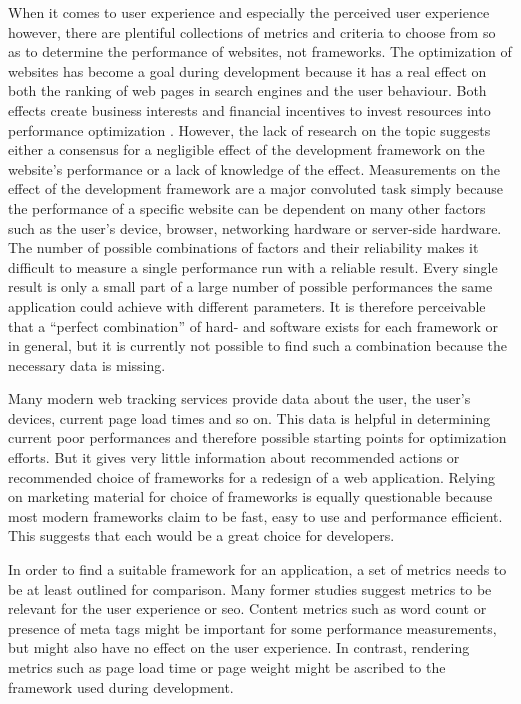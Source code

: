 \documentclass[a4paper, 12pt]{article}
\begin{document}
When it comes to user experience and especially the perceived user experience however, there are plentiful collections of metrics and criteria to choose from so as to determine the performance of websites, not frameworks.
The optimization of websites has become a goal during development because it has a real effect on both the ranking of web pages in search engines and the user behaviour.
Both effects create business interests and financial incentives to invest resources into performance optimization \citep{webprophet,effectsofwebpagecontents}.
However, the lack of research on the topic suggests either a consensus for a negligible effect of the development framework on the website's performance or a lack of knowledge of the effect.
Measurements on the effect of the development framework are a major convoluted task simply because the performance of a specific website can be dependent on many other factors such as the user's device, browser, networking hardware or server-side hardware.
The number of possible combinations of factors and their reliability makes it difficult to measure a single performance run with a reliable result.
Every single result is only a small part of a large number of possible performances the same application could achieve with different parameters.
It is therefore perceivable that a \enquote{perfect combination} of hard- and software exists for each framework or in general, but it is currently not possible to find such a combination because the necessary data is missing.

Many modern web tracking services provide data about the user, the user's devices, current page load times and so on.
This data is helpful in determining current poor performances and therefore possible starting points for optimization efforts.
But it gives very little information about recommended actions or recommended choice of frameworks for a redesign of a web application.
Relying on marketing material for choice of frameworks is equally questionable because most modern frameworks claim to be fast, easy to use and performance efficient.
This suggests that each would be a great choice for developers.

In order to find a suitable framework for an application, a set of metrics needs to be at least outlined for comparison.
Many former studies suggest metrics to be relevant for the user experience or \acrlong{seo}.
Content metrics such as word count or presence of meta tags might be important for some performance measurements, but might also have no effect on the user experience.
In contrast, rendering metrics such as page load time or page weight might be ascribed to the framework used during development.
\end{document}
